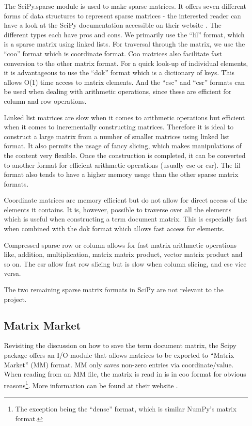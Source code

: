 The SciPy.sparse module is used to make sparse matrices. It offers
seven different forms of data structures to represent sparse matrices
- the interested reader can have a look at the SciPy documentation
accessible on their website \cite{SciPy}. The different types each have pros and
cons. We primarily use the ``lil'' format, which is a sparse matrix
using linked lists. For traversal through the matrix, we use the ``coo''
format which is coordinate format. Coo matrices also facilitate fast
conversion to the other matrix format. For a quick look-up of
individual elements, it is advantageous to use the ``dok'' format which
is a dictionary of keys. This allows O(1) time access to matrix
elements. And the ``csc'' and ``csr'' formats can be used when dealing
with arithmetic operations, since these are efficient for column and
row operations.

Linked list matrices are slow when it comes to arithmetic
operations but efficient when it comes to incrementally constructing
matrices. Therefore it is ideal to construct a large matrix from a
number of smaller matrices using linked list format. It also permits
the usage of fancy slicing, which makes manipulations of the content
very flexible. Once the construction is completed, it can be converted to
another format for efficient arithmetic operations (usually csc or
csr). The lil format also tends to have a higher memory usage than the
other sparse matrix formats.

Coordinate matrices are memory efficient but do not allow for
direct access of the elements it contains. It is, however, possible to
traverse over all the elements which is useful when constructing a
term document matrix. This is especially fast when combined with the
dok format which allows fast access for elements.

Compressed sparse row or column allows for fast matrix
arithmetic operations like, addition, multiplication, matrix matrix
product, vector matrix product and so on. The csr allow fast row
slicing but is slow when column slicing, and csc vice versa.

The two remaining sparse matrix formats in SciPy are not relevant to the
project.

\subsection{Matrix Market\label{MatrixMarket}}

Revisiting the discussion on how to save the term document matrix, the
Scipy package \cite{SciPy} offers an I/O-module that allows matrices
to be exported to ``Matrix Market'' (MM) format. MM only saves
non-zero entries via coordinate/value. When reading from an MM
file, the matrix is read in is in coo format for obvious
reasons\footnote{The exception being the ``dense'' format, which is
  similar NumPy's matrix format.}. More information can be found at
their website \cite{MatrixMarket}.

